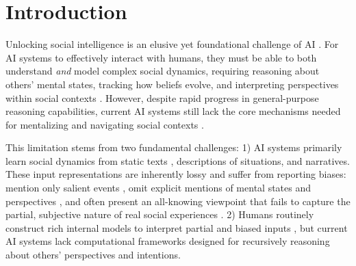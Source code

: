 
\section{Introduction}
\label{sec:introduction}
\vspace{-0.5 em}


Unlocking social intelligence is an elusive yet foundational challenge of AI \citep{Gunning2018machineCommonsense}.
For AI systems to effectively interact with humans, they must be able to both understand \textit{and} model complex social dynamics, requiring reasoning about others’ mental states, tracking how beliefs evolve, and interpreting perspectives within social contexts \citep{sap2023neuraltheoryofmindlimitssocial, Tomasello2009why}. However, despite rapid progress in general-purpose reasoning capabilities, current AI systems still lack the core mechanisms needed for mentalizing and navigating social contexts \citep{shapira2023cleverhansneuraltheory,yerukola2024pope,kim-etal-2023-fantom}. 

This limitation stems from two fundamental challenges: 1) AI systems primarily learn social dynamics from static texts \citep{sap2023neuraltheoryofmindlimitssocial}, descriptions of situations, and narratives. These input representations are inherently lossy and suffer from reporting biases: mention only salient events \citep{gordon2013reporting}, omit explicit mentions of mental states and perspectives \citep{lucy2017distributional}, and often present an all-knowing viewpoint that fails to capture the partial, subjective nature of real social experiences \citep{Fischbach2021, Epstein1999, Mar2008, Mani2012}. 2) Humans routinely construct rich internal models to interpret partial and biased inputs \citep{frith2006neural, johnson-laird1983, hinsz1995mental}, but current AI systems lack computational frameworks designed for recursively reasoning about others’ perspectives and intentions.


